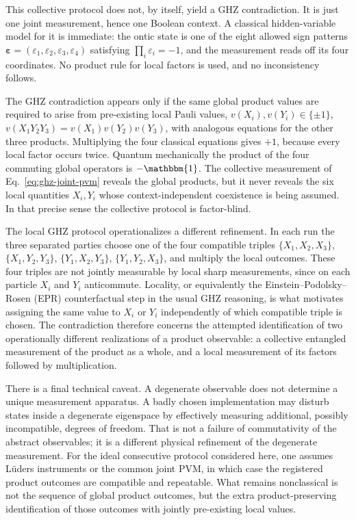 \documentclass[aps,pra,twocolumn,superscriptaddress,nofootinbib]{revtex4-2}
\newcommand{\id}{\mathbbm{1}}
\begin{document}
This collective protocol does not, by itself, yield a GHZ contradiction.  It is just one joint measurement, hence one Boolean context.  A classical hidden-variable model for it is immediate: the ontic state is one of the eight allowed sign patterns $\boldsymbol\varepsilon=(\varepsilon_1,\varepsilon_2,\varepsilon_3,\varepsilon_4)$ satisfying $\prod_i\varepsilon_i=-1$, and the measurement reads off its four coordinates.  No product rule for local factors is used, and no inconsistency follows.

The GHZ contradiction appears only if the same global product values are required to arise from pre-existing local Pauli values,
$v(X_i),v(Y_i)\in\{\pm1\}$,
$v(X_1Y_2Y_3)=v(X_1)v(Y_2)v(Y_3)$,
with analogous equations for the other three products.  Multiplying the four classical equations gives $+1$, because every local factor occurs twice.  Quantum mechanically the product of the four commuting global operators is $-\id$.  The collective measurement of Eq.~\eqref{eq:ghz-joint-pvm} reveals the global products, but it never reveals the six local quantities $X_i,Y_i$ whose context-independent coexistence is being assumed.  In that precise sense the collective protocol is factor-blind.

The local GHZ protocol operationalizes a different refinement.  In each run the three separated parties choose one of the four compatible triples
        $\{X_1,X_2,X_3\}$,
        $\{X_1,Y_2,Y_3\}$,
        $\{Y_1,X_2,Y_3\}$,
        $\{Y_1,Y_2,X_3\}$,
and multiply the local outcomes.  These four triples are not jointly measurable by local sharp measurements, since on each particle $X_i$ and $Y_i$ anticommute.  Locality, or equivalently the Einstein--Podolsky--Rosen (EPR) counterfactual step in the usual GHZ reasoning, is what motivates assigning the same value to $X_i$ or $Y_i$ independently of which compatible triple is chosen.  The contradiction therefore concerns the attempted identification of two operationally different realizations of a product observable: a collective entangled measurement of the product as a whole, and a local measurement of its factors followed by multiplication.


There is a final technical caveat.  A degenerate observable does not determine a unique measurement apparatus.  A badly chosen implementation may disturb states inside a degenerate eigenspace by effectively measuring additional, possibly incompatible, degrees of freedom.  That is not a failure of commutativity of the abstract observables; it is a different physical refinement of the degenerate measurement.  For the ideal consecutive protocol considered here, one assumes L\"uders instruments or the common joint PVM, in which case the registered product outcomes are compatible and repeatable.  What remains nonclassical is not the sequence of global product outcomes, but the extra product-preserving identification of those outcomes with jointly pre-existing local values.
\end{document}
